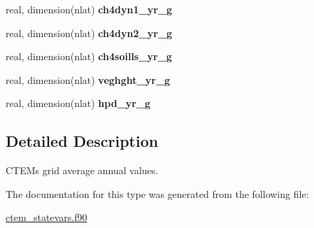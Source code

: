 \begin{DoxyCompactItemize}
\item 
\hypertarget{structctem__statevars_1_1ctem__gridavg__annual_a69697042dee989c18a02ac0b14fee186}{}real, dimension(nlat) {\bfseries ch4dyn1\+\_\+yr\+\_\+g}\label{structctem__statevars_1_1ctem__gridavg__annual_a69697042dee989c18a02ac0b14fee186}

\item 
\hypertarget{structctem__statevars_1_1ctem__gridavg__annual_aa2ac58833bdb7d9d9238161553e8cf07}{}real, dimension(nlat) {\bfseries ch4dyn2\+\_\+yr\+\_\+g}\label{structctem__statevars_1_1ctem__gridavg__annual_aa2ac58833bdb7d9d9238161553e8cf07}

\item 
\hypertarget{structctem__statevars_1_1ctem__gridavg__annual_a33b989a9f77e16ec0619b6e9c90eee7d}{}real, dimension(nlat) {\bfseries ch4soills\+\_\+yr\+\_\+g}\label{structctem__statevars_1_1ctem__gridavg__annual_a33b989a9f77e16ec0619b6e9c90eee7d}

\item 
\hypertarget{structctem__statevars_1_1ctem__gridavg__annual_a19c4180421b5b226f732ed93d96d29c5}{}real, dimension(nlat) {\bfseries veghght\+\_\+yr\+\_\+g}\label{structctem__statevars_1_1ctem__gridavg__annual_a19c4180421b5b226f732ed93d96d29c5}

\item 
\hypertarget{structctem__statevars_1_1ctem__gridavg__annual_a0b05fcb0a1bbf4b2a4ec77e75018eabb}{}real, dimension(nlat) {\bfseries hpd\+\_\+yr\+\_\+g}\label{structctem__statevars_1_1ctem__gridavg__annual_a0b05fcb0a1bbf4b2a4ec77e75018eabb}

\end{DoxyCompactItemize}


\subsection{Detailed Description}
C\+T\+E\+M\textquotesingle{}s grid average annual values. 

The documentation for this type was generated from the following file\+:\begin{DoxyCompactItemize}
\item 
\hyperlink{ctem__statevars_8f90}{ctem\+\_\+statevars.\+f90}\end{DoxyCompactItemize}
